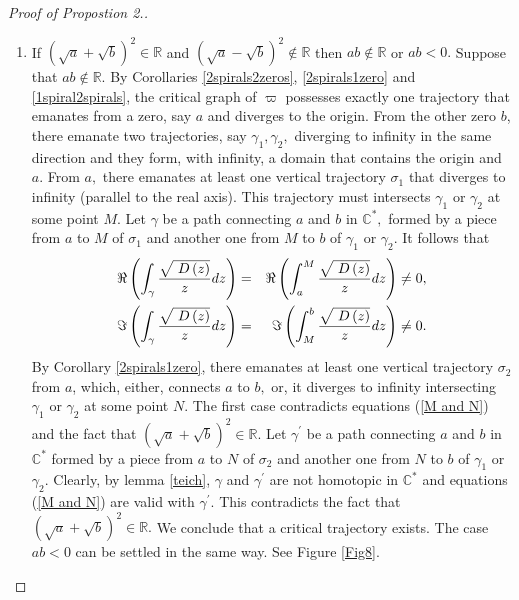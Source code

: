 \documentclass[12pt]{amsart}
\begin{document}
\begin{proof}[Proof of Propostion 2.]
\begin{enumerate}
\item If $\left( \sqrt{a}+\sqrt{b}\right) ^{2}\in 
\mathbb{R}
$ and $\left( \sqrt{a}-\sqrt{b}\right) ^{2}\notin 
\mathbb{R}
$ then $ab\notin 
\mathbb{R}
$ or $ab<0.$\newline
Suppose that $ab\notin 
\mathbb{R}
$. By Corollaries \ref{2spirals2zeros}, \ref{2spirals1zero} and \ref{1spiral2spirals}, the critical graph of $\varpi $ possesses exactly one
trajectory that emanates from a zero, say $a$ and diverges to the origin.
From the other zero $b$, there emanate two trajectories, say $\gamma
_{1},\gamma _{2},$ diverging to infinity in the same direction and they
form, with infinity, a domain that contains the origin and $a$. From $a,$
there emanates at least one vertical trajectory $\sigma _{1}$ that diverges
to infinity (parallel to the real axis). This trajectory must intersects $\gamma _{1}$ or $\gamma _{2}$ at some point $M$. Let $\gamma $ be a path
connecting $a$ and $b$ in $\mathbb{C}
^{\ast },$ formed by a piece from $a$ to $M$ of $\sigma _{1}$ and another
one from $M$ to $b$ of $\gamma _{1}$ or $\gamma _{2}$. It follows that 
\begin{eqnarray}
\Re \left( \int_{\gamma }\dfrac{\sqrt{\ D\left( z\right) }}{z}dz\right) 
&=&\Re \left( \int_{a}^{M}\dfrac{\sqrt{\ D\left( z\right) }}{z}dz\right)
\neq 0,  \label{M and N} \\
\Im \left( \int_{\gamma }\dfrac{\sqrt{\ D\left( z\right) }}{z}dz\right) 
&=&\Im \left( \int_{M}^{b}\dfrac{\sqrt{\ D\left( z\right) }}{z}dz\right)
\neq 0.  \notag
\end{eqnarray}By Corollary \ref{2spirals1zero}, there emanates at least one vertical
trajectory $\sigma _{2}$ from $a$, which, either, connects $a$ to $b,$ or,
it diverges to infinity intersecting $\gamma _{1}$ or $\gamma _{2}$ at some
point $N.$ The first case contradicts equations (\ref{M and N}) and the fact
that $\left( \sqrt{a}+\sqrt{b}\right) ^{2}\in 
\mathbb{R}
.$ Let $\gamma ^{\prime }$ be a path connecting $a$ and $b$ in $\mathbb{C}
^{\ast }$ formed by a piece from $a$ to $N$ of $\sigma _{2}$ and another one
from $N$ to $b$ of $\gamma _{1}$ or $\gamma _{2}$. Clearly, by lemma \ref{teich}, $\gamma $ and $\gamma ^{\prime }$ are not homotopic in $\mathbb{C}
^{\ast }$ and equations (\ref{M and N}) are valid with $\gamma ^{\prime }.$
This contradicts the fact that $\left( \sqrt{a}+\sqrt{b}\right) ^{2}\in 
\mathbb{R}
.$ \newline
We conclude that a critical trajectory exists. The case $ab<0$ can be
settled in the same way. See Figure \ref{Fig8}.

\end{enumerate}
\end{proof}
\end{document}
